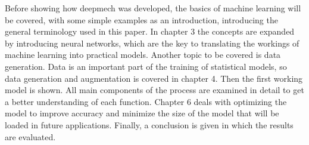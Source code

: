 Before showing how deepmech was developed, the basics of machine learning will be covered, with some simple examples as an introduction, introducing the general terminology used in this paper.
In chapter 3 the concepts are expanded by introducing neural networks, which are the key to translating the workings of machine learning into practical models.
Another topic to be covered is data generation.
Data is an important part of the training of statistical models, so data generation and augmentation is covered in chapter 4.
Then the first working model is shown.
All main components of the process are examined in detail to get a better understanding of each function.
Chapter 6 deals with optimizing the model to improve accuracy and minimize the size of the model that will be loaded in future applications.
Finally, a conclusion is given in which the results are evaluated.
